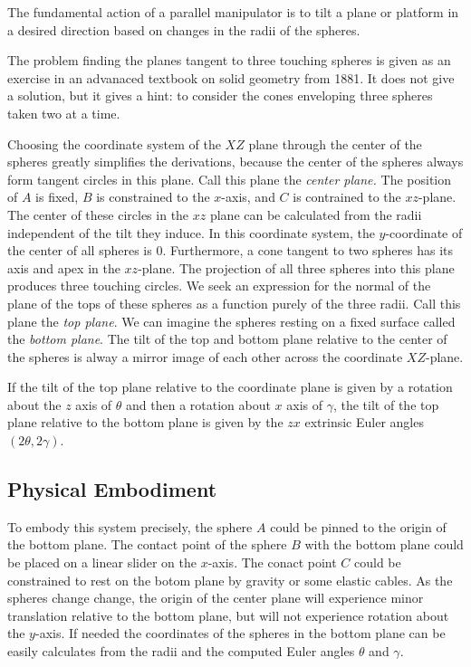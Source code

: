 \documentclass{article}
\begin{document}
The fundamental action of a parallel manipulator is to tilt a plane or platform in a desired direction based
on changes in the radii of the spheres.

The problem finding the planes tangent to three touching spheres
is given as an exercise in an advanaced textbook on solid geometry from 1881\cite{payne1881}. It does not give a solution, but it gives a hint: to consider the cones enveloping
three spheres taken two at a time.

Choosing the coordinate system of the $XZ$ plane through the center of the spheres greatly
simplifies the derivations, because the center of the spheres always form tangent circles
in this plane. Call this plane the {\em center plane.} The position of $A$ is fixed, $B$ is constrained to the $x$-axis, and
$C$ is contrained to the $xz$-plane. The center of these circles in the $xz$ plane can be
calculated from the radii independent of the tilt they induce.
In this coordinate system, the $y$-coordinate of the center of all spheres is $0$.
Furthermore, a cone tangent to two spheres has its axis and apex in the $xz$-plane.
The projection of all three spheres into this plane produces three touching circles.
We seek an expression for the normal of the plane of the tops of these spheres as a function
purely of the three radii. Call this plane the {\em top plane}.
We can imagine the spheres resting on a fixed surface called the {\em bottom plane}.
The tilt of the top and bottom plane relative to the center of the spheres
is alway a mirror image of each other across the coordinate $XZ$-plane.

If the tilt of the top plane relative to the coordinate plane is given by a rotation about the $z$ axis of $\theta$ and
then a rotation about $x$ axis of $\gamma$, the tilt of the top plane relative
to the bottom plane is given by the $zx$ extrinsic Euler angles $(2\theta, 2\gamma)$.

\subsection{Physical Embodiment}

To embody this system precisely, the sphere $A$ could be pinned to
the origin of the bottom plane.
The contact point of the sphere $B$ with the bottom plane could be placed on a
linear slider on the $x$-axis. The conact point $C$ could be constrained to
rest on the botom plane by gravity or some elastic cables. As the spheres
change change, the origin of the center plane will experience minor translation
relative to the bottom plane, but will not experience rotation about the $y$-axis.
If needed the coordinates of the spheres in the bottom plane can be easily
calculates from the radii and the computed Euler angles $\theta$ and $\gamma$.
\end{document}
